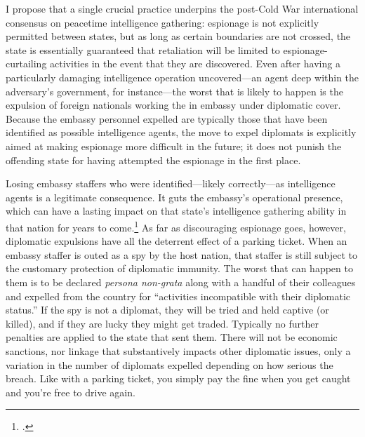 \documentclass{report}
\begin{document}
\begin{refsegment}
I propose that a single crucial practice underpins the post-Cold War international consensus on peacetime intelligence gathering: espionage is not explicitly permitted between states, but as long as certain boundaries are not crossed, the state is essentially guaranteed that retaliation will be limited to espionage-curtailing activities in the event that they are discovered. Even after having a particularly damaging intelligence operation uncovered---an agent deep within the adversary's government, for instance---the worst that is likely to happen is the expulsion of foreign nationals working the in embassy under diplomatic cover. Because the embassy personnel expelled are typically those that have been identified as possible intelligence agents, the move to expel diplomats is explicitly aimed at making espionage more difficult in the future; it does not punish the offending state for having attempted the espionage in the first place.

Losing embassy staffers who were identified---likely correctly---as intelligence agents is a legitimate consequence. It guts the embassy's operational presence, which can have a lasting impact on that state's intelligence gathering ability in that nation for years to come.\footcite{macintyre_spy_2018} As far as discouraging espionage goes, however, diplomatic expulsions have all the deterrent effect of a parking ticket. When an embassy staffer is outed as a spy by the host nation, that staffer is still subject to the customary protection of diplomatic immunity. The worst that can happen to them is to be declared \emph{persona non-grata} along with a handful of their colleagues and expelled from the country for ``activities incompatible with their diplomatic status.'' If the spy is not a diplomat, they will be tried and held captive (or killed), and if they are lucky they might get traded. Typically no further penalties are applied to the state that sent them. There will not be economic sanctions, nor linkage that substantively impacts other diplomatic issues, only a variation in the number of diplomats expelled depending on how serious the breach. Like with a parking ticket, you simply pay the fine when you get caught and you're free to drive again.


\end{refsegment}
\end{document}
